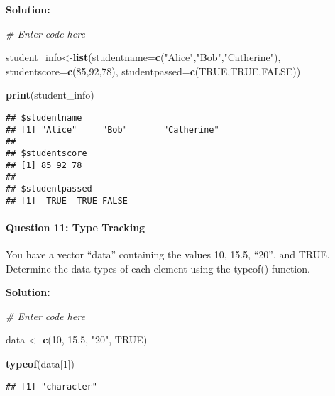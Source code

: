\documentclass[
]{article}
\newenvironment{Shaded}{\begin{snugshade}}{\end{snugshade}}
\newcommand{\AttributeTok}[1]{\textcolor[rgb]{0.13,0.29,0.53}{#1}}
\newcommand{\CommentTok}[1]{\textcolor[rgb]{0.56,0.35,0.01}{\textit{#1}}}
\newcommand{\ConstantTok}[1]{\textcolor[rgb]{0.56,0.35,0.01}{#1}}
\newcommand{\DecValTok}[1]{\textcolor[rgb]{0.00,0.00,0.81}{#1}}
\newcommand{\FloatTok}[1]{\textcolor[rgb]{0.00,0.00,0.81}{#1}}
\newcommand{\FunctionTok}[1]{\textcolor[rgb]{0.13,0.29,0.53}{\textbf{#1}}}
\newcommand{\NormalTok}[1]{#1}
\newcommand{\OtherTok}[1]{\textcolor[rgb]{0.56,0.35,0.01}{#1}}
\newcommand{\StringTok}[1]{\textcolor[rgb]{0.31,0.60,0.02}{#1}}
\begin{document}
\textbf{Solution:}

\begin{Shaded}
\begin{Highlighting}[]
\CommentTok{\# Enter code here}

\NormalTok{student\_info}\OtherTok{\textless{}{-}}\FunctionTok{list}\NormalTok{(}\AttributeTok{studentname=}\FunctionTok{c}\NormalTok{(}\StringTok{"Alice"}\NormalTok{,}\StringTok{"Bob"}\NormalTok{,}\StringTok{"Catherine"}\NormalTok{), }\AttributeTok{studentscore=}\FunctionTok{c}\NormalTok{(}\DecValTok{85}\NormalTok{,}\DecValTok{92}\NormalTok{,}\DecValTok{78}\NormalTok{), }\AttributeTok{studentpassed=}\FunctionTok{c}\NormalTok{(}\ConstantTok{TRUE}\NormalTok{,}\ConstantTok{TRUE}\NormalTok{,}\ConstantTok{FALSE}\NormalTok{))}

\FunctionTok{print}\NormalTok{(student\_info)}
\end{Highlighting}
\end{Shaded}

\begin{verbatim}
## $studentname
## [1] "Alice"     "Bob"       "Catherine"
## 
## $studentscore
## [1] 85 92 78
## 
## $studentpassed
## [1]  TRUE  TRUE FALSE
\end{verbatim}

\hypertarget{question-11-type-tracking}{%
\paragraph{Question 11: Type Tracking}\label{question-11-type-tracking}}

You have a vector ``data'' containing the values 10, 15.5, ``20'', and
TRUE. Determine the data types of each element using the typeof()
function.

\textbf{Solution:}

\begin{Shaded}
\begin{Highlighting}[]
\CommentTok{\# Enter code here}

\NormalTok{data }\OtherTok{\textless{}{-}} \FunctionTok{c}\NormalTok{(}\DecValTok{10}\NormalTok{, }\FloatTok{15.5}\NormalTok{, }\StringTok{"20"}\NormalTok{, }\ConstantTok{TRUE}\NormalTok{)}

\FunctionTok{typeof}\NormalTok{(data[}\DecValTok{1}\NormalTok{])}
\end{Highlighting}
\end{Shaded}

\begin{verbatim}
## [1] "character"
\end{verbatim}
\end{document}
